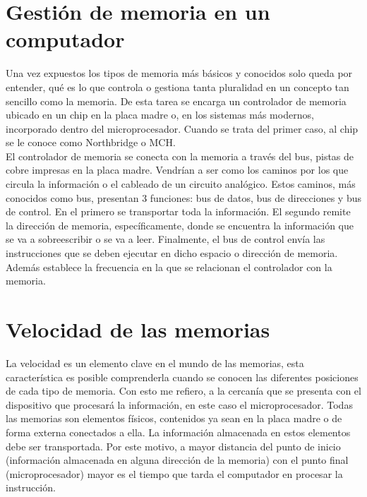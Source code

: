 \documentclass{article}
\begin{document}
\section{Gestión de memoria en un computador}
\noindent
Una vez expuestos los tipos de memoria más básicos y conocidos solo queda por entender, qué es lo que controla o gestiona tanta pluralidad en un concepto tan sencillo como la memoria.
De esta tarea se encarga un controlador de memoria ubicado en un chip en la placa madre o, en los sistemas más modernos, incorporado dentro del microprocesador. Cuando se trata del primer caso, al chip se le conoce como Northbridge o MCH.\\

\noindent
El controlador de memoria se conecta con la memoria a través del bus, pistas de cobre impresas en la placa madre. Vendrían a ser como los caminos por los que circula la información o el cableado de un circuito analógico.
Estos caminos, más conocidos como bus, presentan 3 funciones: bus de datos, bus de direcciones y bus de control.
En el primero se transportar toda la información.
El segundo remite la dirección de memoria, específicamente, donde se encuentra la información que se va a sobreescribir o se va a leer.
Finalmente, el bus de control envía las instrucciones que se deben ejecutar en dicho espacio o dirección de memoria. Además establece la frecuencia en la que se relacionan el controlador con la memoria. 

\section{Velocidad de las memorias}
\noindent
La velocidad es un elemento clave en el mundo de las memorias, esta característica es posible comprenderla cuando se conocen las diferentes posiciones de cada tipo de memoria. Con esto me refiero, a la cercanía que se presenta con el dispositivo que procesará la información, en este caso el microprocesador. 
Todas las memorias son elementos físicos, contenidos ya sean en la placa madre o de forma externa conectados a ella. La información almacenada en estos elementos debe ser transportada. Por este motivo, a mayor distancia del punto de inicio (información almacenada en alguna dirección de la memoria) con el punto final (microprocesador) mayor es el tiempo que tarda el computador en procesar la instrucción. 



\end{document}
